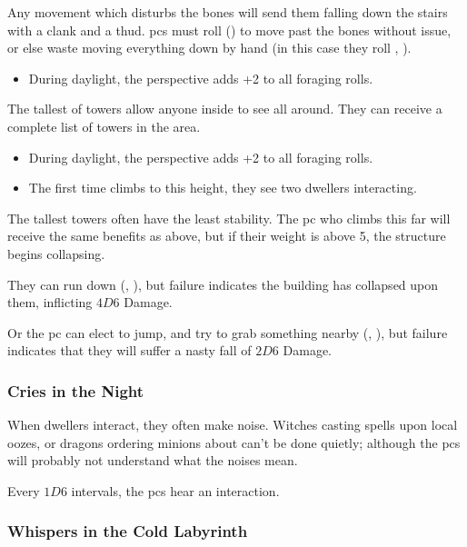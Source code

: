 \begin{multicols}{2}
\begin{dlist}
  Any movement which disturbs the bones will send them falling down the stairs with a clank and a thud.
  \Glspl{pc} must roll  (\tn[11]) to move past the bones without issue, or else waste  moving everything down by hand (in this case they roll , \tn[7]).
  \begin{itemize}
    \item
    During daylight, the perspective adds +2 to all foraging rolls.
  \end{itemize}
  \item
  The tallest of towers allow anyone inside to see all around.
  They can receive a complete list of towers in the area.
  \begin{itemize}
    \item
    During daylight, the perspective adds +2 to all foraging rolls.
    \item
    The first time  climbs to this height, they see two dwellers interacting.
  \end{itemize}
  \item
  The tallest towers often have the least stability.
  The \gls{pc} who climbs this far will receive the same benefits as above, but if their \gls{weight} is above 5, the structure begins collapsing.

  They can run down (, \tn[9]), but failure indicates the building has collapsed upon them, inflicting $4D6$ Damage.

  Or the \gls{pc} can elect to jump, and try to grab something nearby (, \tn[12]), but failure indicates that they will suffer a nasty fall of $2D6$ Damage.
\end{dlist}

\bigLine

\subsubsection{Cries in the Night}
\label{lostCries}

When dwellers interact, they often make noise.
Witches casting spells upon local oozes, or dragons ordering minions about can't be done quietly; although the \glspl{pc} will probably not understand what the noises mean.

Every $1D6$ \glspl{interval}, the \glspl{pc} hear an interaction.

\subsubsection{Whispers in the Cold Labyrinth}
\label{lostWhispers}


\end{multicols}
